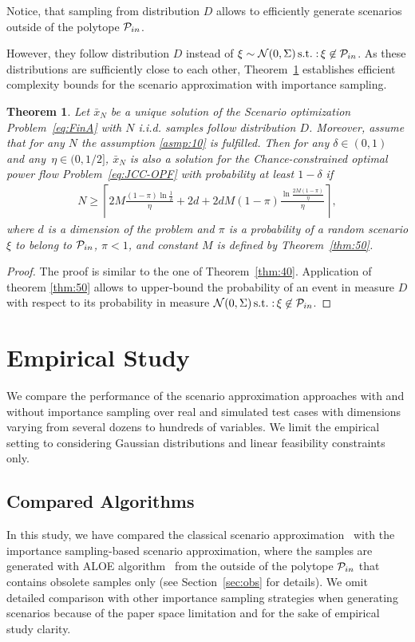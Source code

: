 \documentclass{IEEEtran4PSCC}
\newtheorem{theorem}{Theorem}[section]
\DeclareMathOperator*{\st}{s.t.:}
\newcommand{\cP}{{\cal P}}
\newcommand{\cN}{{\cal N}}
\begin{document}
Notice, that sampling from distribution $D$ allows to efficiently generate scenarios outside of the polytope $\cP_{in}$. 

However, they follow distribution $D$ instead of $\xi\sim \cN(0, \Sigma) \st \xi\not\in \cP_{in}$. As these distributions are sufficiently close to each other, Theorem~\ref{thm:80} establishes efficient complexity bounds for the scenario approximation with importance sampling. 

\begin{theorem}\label{thm:80}
Let $\bar x_N$ be a unique solution of the Scenario optimization Problem~\eqref{eq:FinA} with $N$ i.i.d. samples follow distribution $D$. Moreover, assume that for any $N$ the assumption \ref{asmp:10} is fulfilled. Then for any $\delta \in (0,1)$ and any~$\eta \in (0, 1/2]$, $\bar x_N$ is also a solution for the Chance-constrained optimal power flow Problem~\eqref{eq:JCC-OPF} with probability at least $1-\delta$ if 
\begin{align*}
  N \ge \left\lceil 2M\frac{(1-\pi)\ln \frac{1}{\delta}}{\eta} + 2d + 2d M(1-\pi) \frac{\ln\frac{2M(1-\pi)}{\eta}}{\eta} \right\rceil, 
\end{align*} 
where $d$ is a dimension of the problem and $\pi$ is a probability of a random scenario $\xi$ to belong to $\cP_{in}$, $\pi < 1$, and constant $M$ is defined by Theorem~\ref{thm:50}. 
\end{theorem}
\begin{proof}
The proof is similar to the one of Theorem~\ref{thm:40}. Application of theorem \ref{thm:50} allows to upper-bound the probability of an event in measure $D$ with respect to its probability in measure $\cN(0,\Sigma) \st \xi\not\in\cP_{in}$. 
\end{proof}

\section{Empirical Study}\label{sec:emp}
We compare the performance of the scenario approximation approaches with and without importance sampling over real and simulated test cases with dimensions varying from several dozens to hundreds of variables. We limit the empirical setting to considering Gaussian distributions and linear feasibility constraints only.

\subsection{Compared Algorithms} 
In this study, we have compared the classical scenario approximation~\cite{calafiore2006scenario} with the importance sampling-based scenario approximation, where the samples are generated with ALOE algorithm~\cite{owen2019importance} from the outside of the polytope $\cP_{in}$ that contains obsolete samples only (see Section~\ref{sec:obs} for details). We omit detailed comparison with other importance sampling strategies \cite{genz2020package,lukashevich2021power,bugallo2017adaptive} when generating scenarios because of the paper space limitation and for the sake of empirical study clarity. 
\end{document}
